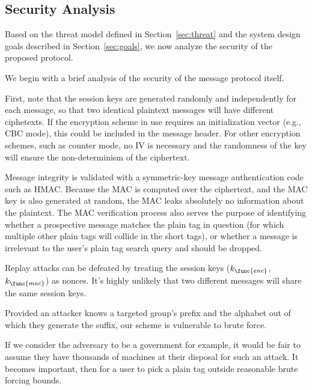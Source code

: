 \subsection{Security Analysis}
\label{sec:security}

Based on the threat model defined in Section~\ref{sec:threat} and the
system design goals described in Section~\ref{sec:goals}, we now analyze
the security of the proposed \hoot protocol.

%
We begin with a brief analysis of the security of the message protocol
itself.

First, note that the session keys are generated randomly and
independently for each message, so that two identical plaintext messages
will have different ciphetexts. If the encryption scheme in use requires
an initialization vector (e.g., CBC mode), this could be included in the
message header. For other encryption schemes, such as counter mode, no
IV is necessary and the randomness of the key will ensure the
non-determinism of the ciphertext.

Message integrity is validated with a symmetric-key message
authentication code such as HMAC. Because the MAC is computed over the
ciphertext, and the MAC key is also generated at random, the MAC leaks
absolutely no information about the plaintext. The MAC verification
process also serves the purpose of identifying whether a prospective
message matches the plain tag in question (for which multiple other
plain tags will collide in the short tags), or whether a message is
irrelevant to the user's plain tag search query and should be dropped.

Replay attacks can be defeated by treating the session keys
($k_{\func{enc}}$, $k_{\func{mac}}$) as nonces. It's highly unlikely
that two different messages will share the same session keys.


%
Provided an attacker knows a targeted group's prefix and the alphabet
out of which they generate the suffix, our scheme is vulnerable to brute
force.

If we consider the adversary to be a government for example, it would be fair to assume they have
thousands of machines at their disposal for such an attack. It becomes
important, then for a user to pick a plain tag outside reasonable brute
forcing bounds.


%


